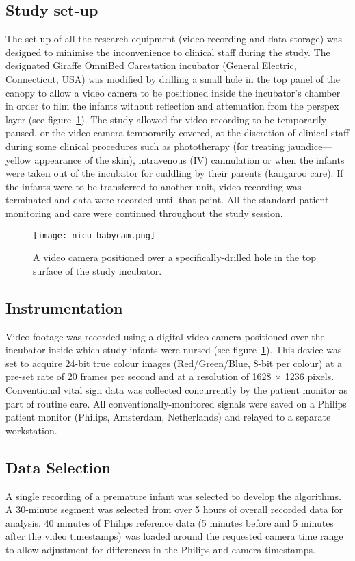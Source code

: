 \subsection{Study set-up}
The set up of all the research equipment (video recording and data storage) was designed to minimise the inconvenience to clinical staff during the study. The designated Giraffe OmniBed Carestation incubator (General Electric, Connecticut, USA) was modified by drilling a small hole in the top panel of the canopy to allow a video camera to be positioned inside the incubator's chamber in order to film the infants without reflection and attenuation from the perspex layer (see figure~\ref{babycam}).  The study allowed for video recording to be temporarily paused, or the video camera temporarily covered, at the discretion of clinical staff during some clinical procedures such as phototherapy (for treating jaundice—yellow appearance of the skin), intravenous (IV) cannulation or when the infants were taken out of the incubator for cuddling by their parents (kangaroo care). If the infants were to be transferred to another unit, video recording was terminated and data were recorded until that point.
All the standard patient monitoring and care were continued throughout the study session.

\begin{center}
\begin{figure}[H]
    \centering
\texttt{[image: nicu\_babycam.png]}
    \caption{A video camera positioned over a specifically-drilled hole in the top surface of the study incubator.}
    \label{babycam}
\end{figure}
\end{center}

\subsection{Instrumentation}
Video footage was recorded using a digital video camera positioned over the incubator inside which study infants were nursed (see figure~\ref{babycam}). This device was set to acquire 24-bit true colour images (Red/Green/Blue, 8-bit per colour) at a pre-set rate of 20 frames per second and at a resolution of 1628 × 1236 pixels. Conventional vital sign data was collected concurrently by the patient monitor as part of routine care. All conventionally-monitored signals were saved on a Philips patient monitor (Philips, Amsterdam, Netherlands)  and relayed to a separate workstation.

\subsection{Data Selection}
A single recording of a premature infant was selected to develop the algorithms. A 30-minute segment was selected from over 5 hours of overall recorded data for analysis. 40 minutes of Philips reference data (5 minutes before and 5 minutes after the video timestamps) was loaded around the requested camera time range to allow adjustment for differences in the Philips and camera timestamps.

